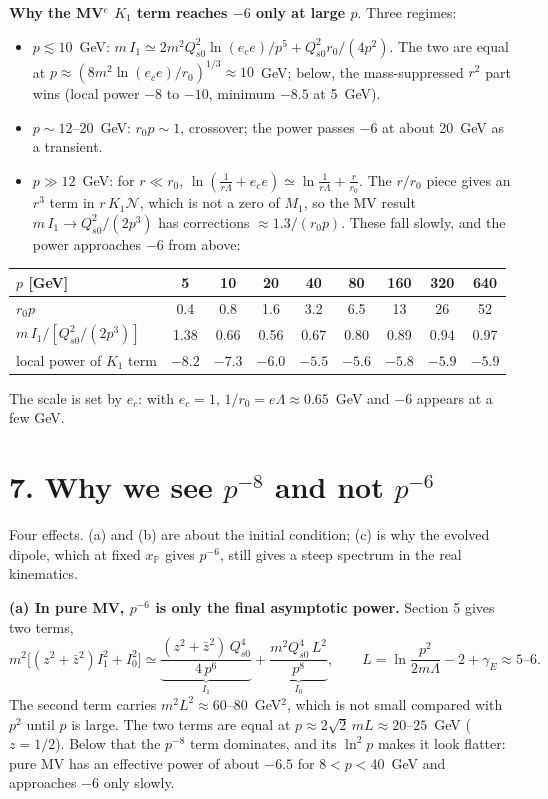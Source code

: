 \documentclass[12pt]{article}
\begin{document}
\textbf{Why the MV$^e$ $K_1$ term reaches $-6$ only at large $p$}. Three regimes:
\begin{itemize}
\item $p\lesssim10$~GeV: $m\,I_1\simeq2m^2Q_{s0}^2\ln(e_ce)/p^5+Q_{s0}^2r_0/(4p^2)$. The two are equal at
$p\approx(8m^2\ln(e_ce)/r_0)^{1/3}\approx10$~GeV; below, the mass-suppressed $r^2$ part wins (local power
$-8$ to $-10$, minimum $-8.5$ at 5~GeV).
\item $p\sim12$--$20$~GeV: $r_0p\sim1$, crossover; the power passes $-6$ at about 20~GeV as a transient.
\item $p\gg12$~GeV: for $r\ll r_0$, $\ln(\frac1{r\Lambda}+e_ce)\simeq\ln\frac1{r\Lambda}+\frac r{r_0}$. The
$r/r_0$ piece gives an $r^3$ term in $r\,K_1\mathcal N$, which is not a zero of $M_1$, so the MV result
$m\,I_1\to Q_{s0}^2/(2p^3)$ has corrections $\approx1.3/(r_0p)$. These fall slowly, and the power approaches
$-6$ from above:
\end{itemize}
\begin{center}
\begin{tabular}{lcccccccc}
\toprule
$p$ [GeV] & 5 & 10 & 20 & 40 & 80 & 160 & 320 & 640 \\
\midrule
$r_0p$ & 0.4 & 0.8 & 1.6 & 3.2 & 6.5 & 13 & 26 & 52 \\
$m\,I_1/[Q_{s0}^2/(2p^3)]$ & 1.38 & 0.66 & 0.56 & 0.67 & 0.80 & 0.89 & 0.94 & 0.97 \\
local power of $K_1$ term & $-8.2$ & $-7.3$ & $-6.0$ & $-5.5$ & $-5.6$ & $-5.8$ & $-5.9$ & $-5.9$ \\
\bottomrule
\end{tabular}
\end{center}
The scale is set by $e_c$: with $e_c=1$, $1/r_0=e\Lambda\approx0.65$~GeV and $-6$ appears at a few GeV.

\section*{7. Why we see $p^{-8}$ and not $p^{-6}$}

Four effects. (a) and (b) are about the initial condition; (c) is why the evolved dipole, which at
fixed $x_{\mathbb P}$ gives $p^{-6}$, still gives a steep spectrum in the real kinematics.

\textbf{(a) In pure MV, $p^{-6}$ is only the final asymptotic power.} Section 5 gives two terms,
\[
  m^2\Big[(z^2+\bar z^2)I_1^2+I_0^2\Big]\simeq
  \underbrace{\frac{(z^2+\bar z^2)\,Q_{s0}^4}{4\,p^6}}_{I_1}
  +\underbrace{\frac{m^2Q_{s0}^4\,L^2}{p^8}}_{I_0},
  \qquad L=\ln\frac{p^2}{2m\Lambda}-2+\gamma_E\approx5\text{--}6 .
\]
The second term carries $m^2L^2\approx60$--$80$~GeV$^2$, which is not small compared with $p^2$ until
$p$ is large. The two terms are equal at $p\approx2\sqrt2\,mL\approx20$--$25$~GeV ($z=1/2$). Below that
the $p^{-8}$ term dominates, and its $\ln^2p$ makes it look flatter: pure MV has an effective power of
about $-6.5$ for $8<p<40$~GeV and approaches $-6$ only slowly.
\end{document}
